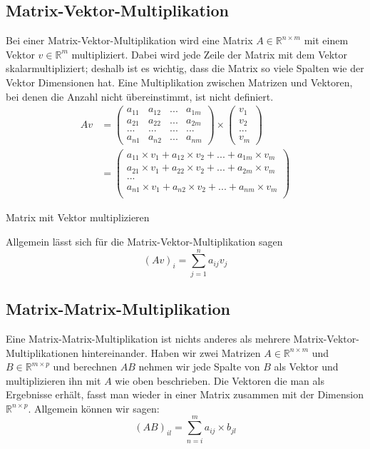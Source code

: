 \subsection{Matrix-Vektor-Multiplikation}
Bei einer Matrix-Vektor-Multiplikation wird eine Matrix $A \in  \mathbb{R}^{n \times m}$ mit einem Vektor $v \in \mathbb{R}^m$ multipliziert. Dabei wird jede Zeile der Matrix mit dem Vektor skalarmultipliziert; deshalb ist es wichtig, dass die Matrix so viele Spalten wie der Vektor Dimensionen hat. Eine Multiplikation zwischen Matrizen und Vektoren, bei denen die Anzahl nicht übereinstimmt, ist nicht definiert.
\begin{align*}
	Av &= 
	\left(
   \begin{array}{cccc}
	  a_{11} & a_{12} & ... & a_{1m}\\
		a_{21} & a_{22} & ... & a_{2m}\\
		...   & ...   & ... & ...  \\
		a_{n1} & a_{n2} & ... & a_{nm}
	 \end{array}
	\right) 
	\times 
	\left(
	 \begin{array}{c}
	  v_1\\
		v_2\\
		...\\
		v_m
	 \end{array}
	\right)\\
	&= \left(
	 \begin{array}{c}
	 a_{11}\times v_1 + a_{12} \times v_2 + ... + a_{1m} \times v_m\\
	 a_{21}\times v_1 + a_{22} \times v_2 + ... + a_{2m} \times v_m\\
		...\\
	 a_{n1}\times v_1 + a_{n2} \times v_2 + ... + a_{nm} \times v_m\\
	 \end{array}
	\right)
\end{align*}
\caption{Matrix mit Vektor multiplizieren}

Allgemein lässt sich für die Matrix-Vektor-Multiplikation sagen
\begin{equation*}
(Av)_i = \sum_{j=1}^{n}a_{ij}v_j 
\end{equation*}

\subsection{Matrix-Matrix-Multiplikation}
Eine Matrix-Matrix-Multiplikation ist nichts anderes als mehrere Matrix-Vektor-Multiplikationen hintereinander. Haben wir zwei Matrizen $A \in \mathbb{R}^{n \times m}$ und $B \in \mathbb{R}^{m \times p}$ und berechnen $AB$ nehmen wir jede Spalte von $B$ als Vektor und multiplizieren ihn mit $A$ wie oben beschrieben. Die Vektoren die man als Ergebnisse erhält, fasst man wieder in einer Matrix zusammen mit der Dimension $\mathbb{R}^{n \times p}$. Allgemein können wir sagen:
\begin{equation*}
	(AB)_{il} = \sum_{n=i}^{m}a_{ij} \times b_{jl}
\end{equation*}


